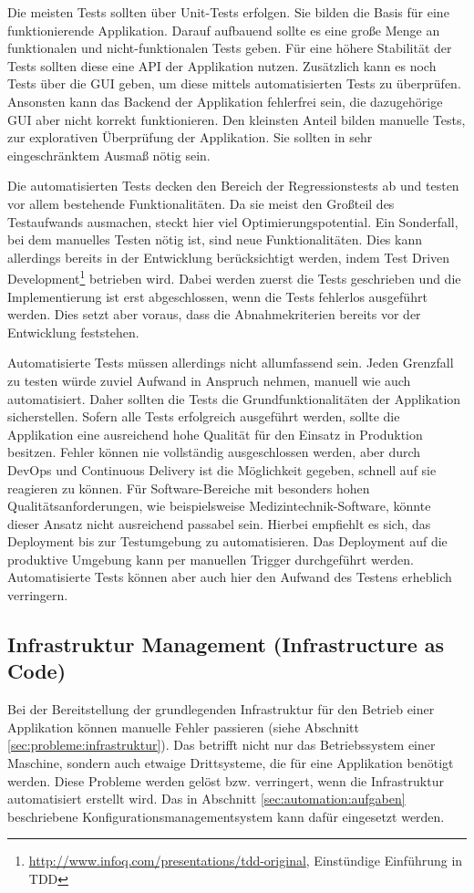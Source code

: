 Die meisten Tests sollten über Unit-Tests erfolgen. Sie bilden die Basis für eine funktionierende Applikation. Darauf aufbauend sollte es eine große Menge an funktionalen und nicht-funktionalen Tests geben. Für eine höhere Stabilität der Tests sollten diese eine API der Applikation nutzen. Zusätzlich kann es noch Tests über die GUI geben, um diese mittels automatisierten Tests zu überprüfen. Ansonsten kann das Backend der Applikation fehlerfrei sein, die dazugehörige GUI aber nicht korrekt funktionieren. Den kleinsten Anteil bilden manuelle Tests, zur explorativen Überprüfung der Applikation. Sie sollten in sehr eingeschränktem Ausmaß nötig sein.

Die automatisierten Tests decken den Bereich der Regressionstests ab und testen vor allem bestehende Funktionalitäten. Da sie meist den Großteil des Testaufwands ausmachen, steckt hier viel Optimierungspotential. Ein Sonderfall, bei dem manuelles Testen nötig ist, sind neue Funktionalitäten. Dies kann allerdings bereits in der Entwicklung berücksichtigt werden, indem Test Driven Development\footnote{\url{http://www.infoq.com/presentations/tdd-original}, Einstündige Einführung in TDD} betrieben wird. Dabei werden zuerst die Tests geschrieben und die Implementierung ist erst abgeschlossen, wenn die Tests fehlerlos ausgeführt werden. Dies setzt aber voraus, dass die Abnahmekriterien bereits vor der Entwicklung feststehen.

Automatisierte Tests müssen allerdings nicht allumfassend sein. Jeden Grenzfall zu testen würde zuviel Aufwand in Anspruch nehmen, manuell wie auch automatisiert. Daher sollten die Tests die Grundfunktionalitäten der Applikation sicherstellen. Sofern alle Tests erfolgreich ausgeführt werden, sollte die Applikation eine ausreichend hohe Qualität für den Einsatz in Produktion besitzen. Fehler können nie vollständig ausgeschlossen werden, aber durch DevOps und Continuous Delivery ist die Möglichkeit gegeben, schnell auf sie reagieren zu können. Für Software-Bereiche mit besonders hohen Qualitätsanforderungen, wie beispielsweise Medizintechnik-Software, könnte dieser Ansatz nicht ausreichend passabel sein. Hierbei empfiehlt es sich, das Deployment bis zur Testumgebung zu automatisieren. Das Deployment auf die produktive Umgebung kann per manuellen Trigger durchgeführt werden. Automatisierte Tests können aber auch hier den Aufwand des Testens erheblich verringern.

\subsection{Infrastruktur Management (Infrastructure as Code)}
\label{sec:devops:infrastructureascode}
Bei der Bereitstellung der grundlegenden Infrastruktur für den Betrieb einer Applikation können manuelle Fehler passieren (siehe Abschnitt \ref{sec:probleme:infrastruktur}). Das betrifft nicht nur das Betriebssystem einer Maschine, sondern auch etwaige Drittsysteme, die für eine Applikation benötigt werden. Diese Probleme werden gelöst bzw. verringert, wenn die Infrastruktur automatisiert erstellt wird. Das in Abschnitt \ref{sec:automation:aufgaben} beschriebene Konfigurationsmanagementsystem  kann dafür eingesetzt werden.

